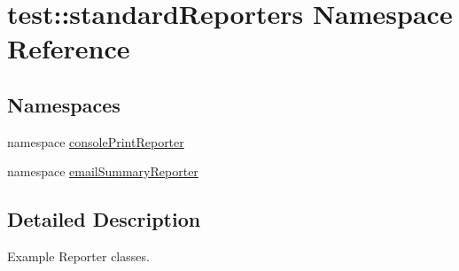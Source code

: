 \hypertarget{namespacetest_1_1standardReporters}{\section{test\-:\-:standard\-Reporters \-Namespace \-Reference}
\label{d1/df8/namespacetest_1_1standardReporters}
}
\subsection*{\-Namespaces}
\begin{DoxyCompactItemize}
\item 
namespace \hyperlink{namespacetest_1_1standardReporters_1_1consolePrintReporter}{console\-Print\-Reporter}
\item 
namespace \hyperlink{namespacetest_1_1standardReporters_1_1emailSummaryReporter}{email\-Summary\-Reporter}
\end{DoxyCompactItemize}


\subsection{\-Detailed \-Description}
\begin{DoxyVerb}
Example Reporter classes.
\end{DoxyVerb}
 